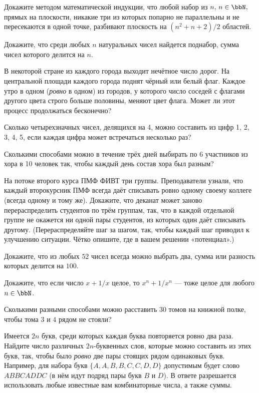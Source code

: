 Докажите методом математической индукции, что любой набор из $n,\,n\in\bbN,$ прямых на плоскости, никакие три из которых попарно не параллельны и не пересекаются в одной точке, разбивают плоскость на $(n^2+n+2)/2$ областей.

Докажите, что среди любых $n$ натуральных чисел найдется поднабор, сумма чисел которого делится на $n$.


В некоторой стране из каждого города выходит нечётное число дорог. На центральной площади каждого города поднят чёрный или белый флаг. Каждое утро в одном (\emph{ровно} в одном) из городов, у которого число соседей с флагами другого цвета строго больше половины, меняют цвет флага. Может ли этот процесс продолжаться бесконечно?

Сколько четырехзначных чисел, делящихся на 4, можно составить из цифр 1, 2, 3, 4, 5, если каждая цифра может встречаться несколько раз?

Сколькими способами можно в течение трёх дней выбирать по 6 участников из хора в 10 человек так, чтобы каждый день состав хора был разным?


На потоке второго курса ПМФ ФИВТ три группы. Преподаватели узнали, что каждый второкурсник ПМФ всегда даёт списывать ровно одному своему коллеге (всегда одному и тому же). Докажите, что деканат может заново перераспределить студентов по трём группам, так, что в каждой отдельной группе не окажется ни одной пары студентов, из которых один даёт списывать другому. (Перераспределяйте шаг за шагом, так, чтобы каждый шаг приводил к улучшению ситуации. Чётко опишите, где в вашем решении «потенциал».)


Докажите, что из любых $52$ чисел всегда можно выбрать два, сумма или разность которых делится на $100$.


Докажите, что если число $x+1/x$ целое, то $x^n+1/x^n$ — тоже целое для любого $n\in\bbN$.


Сколькими разными способами можно расставить $30$ томов на книжной полке, чтобы тома $3$ и $4$ рядом не стояли?


Имеется $2n$ букв, среди которых каждая буква повторяется ровно два раза. Найдите число различных $2n$-буквенных слов, которые можно составить из этих букв, так, чтобы было \emph{ровно} две пары стоящих рядом одинаковых букв. Например, для набора букв $\{A,A,B,B,C,C,D,D\}$ допустимым будет слово $ABBCADDC$ (в нём идут подряд пары букв $B$ и $D$). В ответе разрешается использовать любые известные вам комбинаторные числа, а также суммы.



